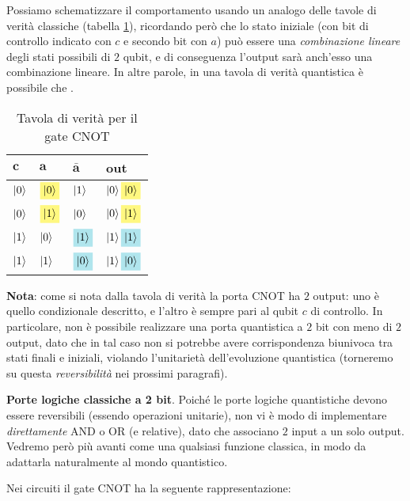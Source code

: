 \documentclass[../../InformazioneQuantistica.tex]{subfiles}
\begin{document}
Possiamo schematizzare il comportamento usando un analogo delle tavole di verità classiche (tabella \ref{tab:C-NOT}), ricordando però che lo stato iniziale (con bit di controllo indicato con $c$ e secondo bit con $a$) può essere una \textit{combinazione lineare} degli stati possibili di $2$ qubit, e di conseguenza l'output sarà anch'esso una combinazione lineare. In altre parole, in una tavola di verità quantistica è possibile che .

\begin{table}[H]
\centering
\begin{tabular}{@{}llll@{}}
\toprule
$\bm{c}$ & $\bm{a}$ & $\bm{\bar{a}}$ & \textbf{out} \\ \midrule
$\Ket{0}$ & $\hlc{Yellow}{\ket{0}}$ & $\Ket{1}$ & $\ket{0}\hlc{Yellow}{\ket{0}}$ \\
$\Ket{0}$ & $\hlc{Yellow}{\ket{1}}$ & $\Ket{0}$ & $\ket{0}\hlc{Yellow}{\ket{1}}$ \\
$\Ket{1}$ & $\Ket{0}$ & $\hlc{SkyBlue}{\ket{1}}$ & $\ket{1}\hlc{SkyBlue}{\ket{1}}$ \\
$\Ket{1}$ & $\Ket{1}$ & $\hlc{SkyBlue}{\ket{0}}$ & $\ket{1}\hlc{SkyBlue}{\ket{0}}$ \\ \bottomrule
\end{tabular}
\caption{Tavola di verità per il gate CNOT}
\label{tab:C-NOT}
\end{table}

\textbf{Nota}: come si nota dalla tavola di verità la porta CNOT ha $2$ output: uno è quello condizionale descritto, e l'altro è sempre pari al qubit $c$ di controllo. In particolare, non è possibile realizzare una porta quantistica a $2$ bit con meno di $2$ output, dato che in tal caso non si potrebbe avere corrispondenza biunivoca tra stati finali e iniziali, violando l'unitarietà dell'evoluzione quantistica (torneremo su questa \textit{reversibilità} nei prossimi paragrafi).
\begin{expl}
\textbf{Porte logiche classiche a 2 bit}. Poiché le porte logiche quantistiche devono essere reversibili (essendo operazioni unitarie), non vi è modo di implementare \textit{direttamente} AND o OR (e relative), dato che associano $2$ input a un solo output. Vedremo però più avanti come  una qualsiasi funzione classica, in modo da adattarla naturalmente al mondo quantistico.
\end{expl}

Nei circuiti il gate CNOT ha la seguente rappresentazione:
\end{document}
